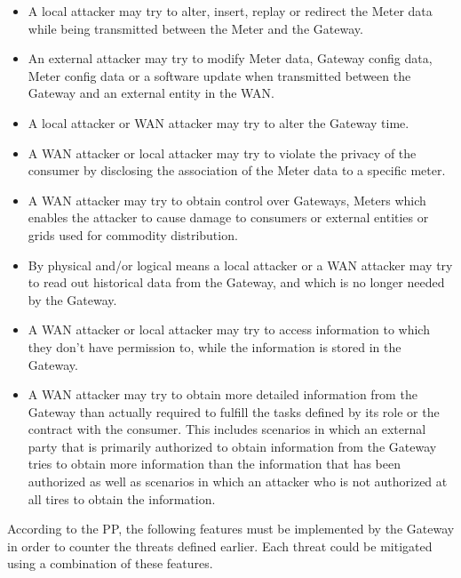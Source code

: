\begin{itemize}
\item A local attacker may try to alter, insert, replay or redirect the Meter data while being transmitted between the Meter and the Gateway.
\item An external attacker may try to modify Meter data, Gateway config data, Meter config data or a software update when transmitted between the Gateway and an external entity in the WAN.
\item A local attacker or WAN attacker may try to alter the Gateway time.
\item A WAN attacker or local attacker may try to violate the privacy of the consumer by disclosing the association of the Meter data to a specific meter.
\item A WAN attacker may try to obtain control over Gateways, Meters which enables the attacker to cause damage to consumers or external entities or grids used for commodity distribution.
\item By physical and/or logical means a local attacker or a WAN attacker may try to read out historical data from the Gateway, and which is no longer needed by the Gateway.
\item A WAN attacker or local attacker may try to access information to which they don’t have permission to, while the information is stored in the Gateway.
\item A WAN attacker may try to obtain more detailed information from the Gateway than actually required to fulfill the tasks defined by its role or the contract with the consumer. This includes scenarios in which an external party that is primarily authorized to obtain information from the Gateway tries to obtain more information than the information that has been authorized as well as scenarios in which an attacker who is not authorized at all tires to obtain the information.
\end{itemize}

According to the PP, the following features must be implemented by the Gateway in order to counter the threats defined earlier. Each threat could be mitigated using a combination of these features.

